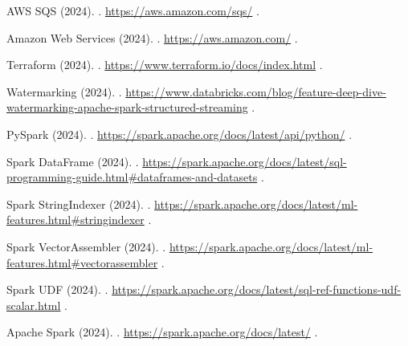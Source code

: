 \begin{thebibliography}{99}
    AWS SQS (2024).
    .
    \newblock \url{https://aws.amazon.com/sqs/}
    \newblock [Accessed: 01/04/2025].

    Amazon Web Services (2024).
    .
    \newblock \url{https://aws.amazon.com/}
    \newblock [Accessed: 01/04/2025].

    Terraform (2024).
    .
    \newblock \url{https://www.terraform.io/docs/index.html}
    \newblock [Accessed: 01/04/2025].


    Watermarking (2024).
    .
    \newblock \url{https://www.databricks.com/blog/feature-deep-dive-watermarking-apache-spark-structured-streaming}
    \newblock [Accessed: 01/04/2025].

    PySpark (2024).
    .
    \newblock \url{https://spark.apache.org/docs/latest/api/python/}
    \newblock [Accessed: 01/04/2025].

    Spark DataFrame (2024).
    .
    \newblock \url{https://spark.apache.org/docs/latest/sql-programming-guide.html#dataframes-and-datasets}
    \newblock [Accessed: 01/04/2025].

    Spark StringIndexer (2024).
    .
    \newblock \url{https://spark.apache.org/docs/latest/ml-features.html#stringindexer}
    \newblock [Accessed: 01/04/2025].

    Spark VectorAssembler (2024).
    .
    \newblock \url{https://spark.apache.org/docs/latest/ml-features.html#vectorassembler}
    \newblock [Accessed: 01/04/2025].

    Spark UDF (2024).
    .
    \newblock \url{https://spark.apache.org/docs/latest/sql-ref-functions-udf-scalar.html}
    \newblock [Accessed: 01/04/2025].

    Apache Spark (2024).
    .
    \newblock \url{https://spark.apache.org/docs/latest/}
    \newblock [Accessed: 01/04/2025].


\end{thebibliography}
